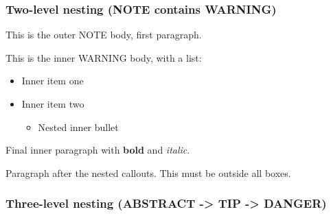 \subsubsection{Two-level nesting (NOTE contains
WARNING)}\label{inner-1-two-level-nesting-note-contains-warning}

\begin{tcolorbox}[breakable,colback=ocGryBack,colframe=ocGryFrame,coltitle=ocGryTitle,left=3mm,boxed title style={left=1mm},title={\hspace*{-2.5mm}\iconNote\; Outer NOTE title}]

This is the outer NOTE body, first paragraph.

\begin{tcolorbox}[breakable,colback=ocOrgBack,colframe=ocOrgFrame,coltitle=ocOrgTitle,left=3mm,boxed title style={left=1mm},title={\hspace*{-2.5mm}\iconWarning\; Inner WARNING title}]

This is the inner WARNING body, with a list:

\begin{itemize}
\tightlist
\item
  Inner item one
\item
  Inner item two

  \begin{itemize}
  \tightlist
  \item
    Nested inner bullet
  \end{itemize}
\end{itemize}

Final inner paragraph with \textbf{bold} and \emph{italic}.

\end{tcolorbox}

\end{tcolorbox}

Paragraph after the nested callouts. This must be outside all boxes.

\subsubsection{Three-level nesting (ABSTRACT -\textgreater{} TIP
-\textgreater{}
DANGER)}\label{inner-1-three-level-nesting-abstract---tip---danger}

